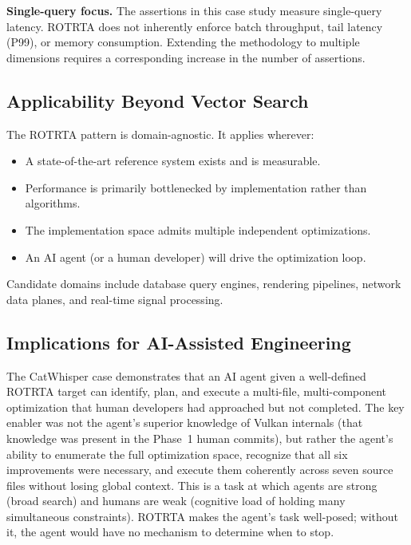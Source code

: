 \documentclass[conference]{IEEEtran}
\begin{document}
\textbf{Single-query focus.}  The assertions in this case study measure
single-query latency.  ROTRTA does not inherently enforce batch throughput,
tail latency (P99), or memory consumption.  Extending the methodology to
multiple dimensions requires a corresponding increase in the number of
assertions.

\subsection{Applicability Beyond Vector Search}

The ROTRTA pattern is domain-agnostic.  It applies wherever:
\begin{itemize}
  \item A state-of-the-art reference system exists and is measurable.
  \item Performance is primarily bottlenecked by implementation rather
        than algorithms.
  \item The implementation space admits multiple independent optimizations.
  \item An AI agent (or a human developer) will drive the optimization loop.
\end{itemize}

Candidate domains include database query engines, rendering pipelines,
network data planes, and real-time signal processing.

\subsection{Implications for AI-Assisted Engineering}

The CatWhisper case demonstrates that an AI agent given a well-defined
ROTRTA target can identify, plan, and execute a multi-file, multi-component
optimization that human developers had approached but not completed.  The
key enabler was not the agent's superior knowledge of Vulkan internals
(that knowledge was present in the Phase~1 human commits), but rather the
agent's ability to enumerate the full optimization space, recognize that all
six improvements were necessary, and execute them coherently across seven
source files without losing global context.  This is a task at which agents
are strong (broad search) and humans are weak (cognitive load of holding
many simultaneous constraints).  ROTRTA makes the agent's task well-posed;
without it, the agent would have no mechanism to determine when to stop.

\end{document}
